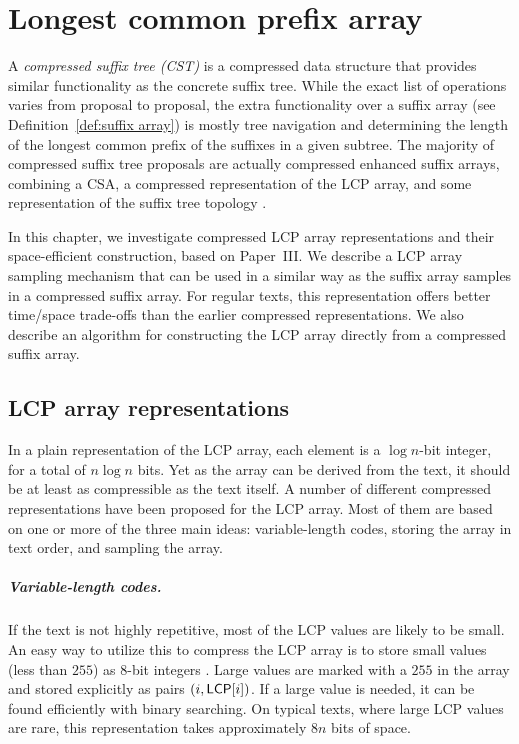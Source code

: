 \chapter{Longest common prefix array}\label{chapter:lcp}

A \emph{compressed suffix tree (CST)} is a compressed data structure that provides similar functionality as the concrete suffix tree. While the exact list of operations varies from proposal to proposal, the extra functionality over a suffix array (see Definition~\ref{def:suffix array}) is mostly tree navigation and determining the length of the longest common prefix of the suffixes in a given subtree. The majority of compressed suffix tree proposals are actually compressed enhanced suffix arrays, combining a CSA, a compressed representation of the LCP array, and some representation of the suffix tree topology \cite{Sadakane2007,Fischer2009a,Maekinen2010,Ohlebusch2009,Ohlebusch2010}.

In this chapter, we investigate compressed LCP array representations and their space-efficient construction, based on Paper~III. We describe a LCP array sampling mechanism that can be used in a similar way as the suffix array samples in a compressed suffix array. For regular texts, this representation offers better time/space trade-offs than the earlier compressed representations. We also describe an algorithm for constructing the LCP array directly from a compressed suffix array.


\section{LCP array representations}\label{sect:lcp representations}

In a plain representation of the LCP array, each element is a $\log n$\nobreakdash-bit integer, for a total of $n \log n$ bits. Yet as the array can be derived from the text, it should be at least as compressible as the text itself. A number of different compressed representations have been proposed for the LCP array. Most of them are based on one or more of the three main ideas: variable-length codes, storing the array in text order, and sampling the array.

\paragraph{Variable-length codes.}

If the text is not highly repetitive, most of the LCP values are likely to be small. An easy way to utilize this to compress the LCP array  is to store small values (less than $255$) as $8$\nobreakdash-bit integers \cite{Abouelhoda2004}. Large values are marked with a $255$ in the array and stored explicitly as pairs $(i, \mathsf{LCP}[i])$. If a large value is needed, it can be found efficiently with binary searching. On typical texts, where large LCP values are rare, this representation takes approximately $8n$ bits of space.

